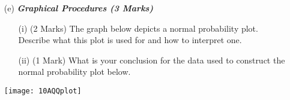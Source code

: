\documentclass[]{article}
\begin{document}
\begin{itemize}
\item[(e)] \textbf{\textit{Graphical Procedures (3 Marks)}}
\begin{itemize}
\item[(i)] (2 Marks) The graph below depicts a normal probability plot. Describe what this plot is used for and how to interpret one.
\item[(ii)](1 Mark) What is your conclusion for the data used to construct the normal probability plot below.
\end{itemize}
\begin{center}
\texttt{[image: 10AQQplot]}
\end{center}


\end{itemize}
\end{document}
